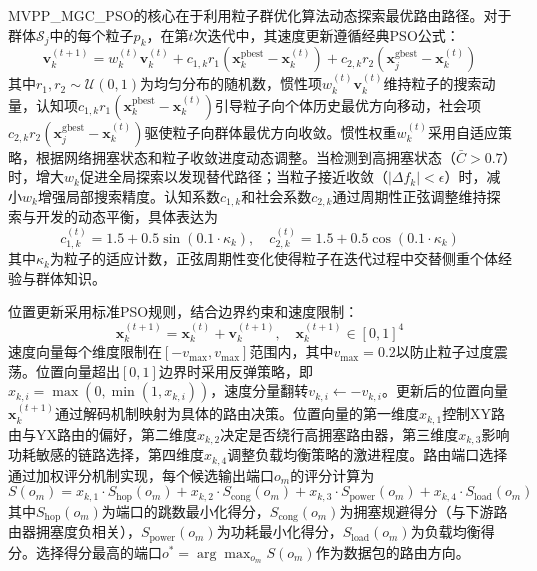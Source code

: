 MVPP\_MGC\_PSO的核心在于利用粒子群优化算法动态探索最优路由路径。对于群体$\mathcal{S}_j$中的每个粒子$p_k$，在第$t$次迭代中，其速度更新遵循经典PSO公式：
\begin{equation}
\mathbf{v}_k^{(t+1)} = w_k^{(t)} \mathbf{v}_k^{(t)} + c_{1,k} r_1 (\mathbf{x}_k^{\text{pbest}} - \mathbf{x}_k^{(t)}) + c_{2,k} r_2 (\mathbf{x}_j^{\text{gbest}} - \mathbf{x}_k^{(t)})
\end{equation}
其中$r_1, r_2 \sim \mathcal{U}(0, 1)$为均匀分布的随机数，惯性项$w_k^{(t)} \mathbf{v}_k^{(t)}$维持粒子的搜索动量，认知项$c_{1,k} r_1 (\mathbf{x}_k^{\text{pbest}} - \mathbf{x}_k^{(t)})$引导粒子向个体历史最优方向移动，社会项$c_{2,k} r_2 (\mathbf{x}_j^{\text{gbest}} - \mathbf{x}_k^{(t)})$驱使粒子向群体最优方向收敛。惯性权重$w_k^{(t)}$采用自适应策略，根据网络拥塞状态和粒子收敛进度动态调整。当检测到高拥塞状态（$\bar{C} > 0.7$）时，增大$w_k$促进全局探索以发现替代路径；当粒子接近收敛（$|\Delta f_k| < \epsilon$）时，减小$w_k$增强局部搜索精度。认知系数$c_{1,k}$和社会系数$c_{2,k}$通过周期性正弦调整维持探索与开发的动态平衡，具体表达为
\begin{equation}
c_{1,k}^{(t)} = 1.5 + 0.5 \sin(0.1 \cdot \kappa_k), \quad c_{2,k}^{(t)} = 1.5 + 0.5 \cos(0.1 \cdot \kappa_k)
\end{equation}
其中$\kappa_k$为粒子的适应计数，正弦周期性变化使得粒子在迭代过程中交替侧重个体经验与群体知识。

位置更新采用标准PSO规则，结合边界约束和速度限制：
\begin{equation}
\mathbf{x}_k^{(t+1)} = \mathbf{x}_k^{(t)} + \mathbf{v}_k^{(t+1)}, \quad \mathbf{x}_k^{(t+1)} \in [0, 1]^4
\end{equation}
速度向量每个维度限制在$[-v_{\max}, v_{\max}]$范围内，其中$v_{\max} = 0.2$以防止粒子过度震荡。位置向量超出$[0, 1]$边界时采用反弹策略，即$x_{k,i} = \max(0, \min(1, x_{k,i}))$，速度分量翻转$v_{k,i} \leftarrow -v_{k,i}$。更新后的位置向量$\mathbf{x}_k^{(t+1)}$通过解码机制映射为具体的路由决策。位置向量的第一维度$x_{k,1}$控制XY路由与YX路由的偏好，第二维度$x_{k,2}$决定是否绕行高拥塞路由器，第三维度$x_{k,3}$影响功耗敏感的链路选择，第四维度$x_{k,4}$调整负载均衡策略的激进程度。路由端口选择通过加权评分机制实现，每个候选输出端口$o_m$的评分计算为
\begin{equation}
S(o_m) = x_{k,1} \cdot S_{\text{hop}}(o_m) + x_{k,2} \cdot S_{\text{cong}}(o_m) + x_{k,3} \cdot S_{\text{power}}(o_m) + x_{k,4} \cdot S_{\text{load}}(o_m)
\end{equation}
其中$S_{\text{hop}}(o_m)$为端口的跳数最小化得分，$S_{\text{cong}}(o_m)$为拥塞规避得分（与下游路由器拥塞度负相关），$S_{\text{power}}(o_m)$为功耗最小化得分，$S_{\text{load}}(o_m)$为负载均衡得分。选择得分最高的端口$o^* = \arg\max_{o_m} S(o_m)$作为数据包的路由方向。

